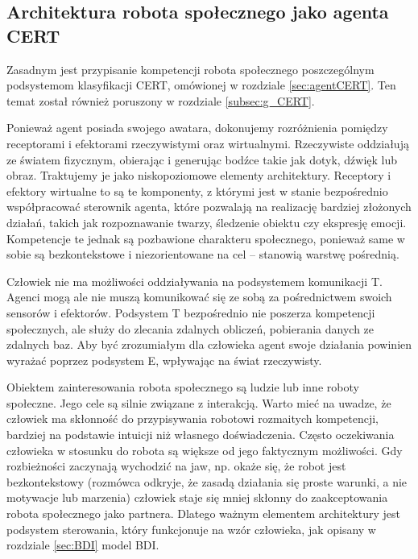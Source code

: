 \subsection{Architektura robota społecznego jako agenta CERT}
\label{subsec:CERT}

Zasadnym jest przypisanie kompetencji robota społecznego poszczególnym podsystemom klasyfikacji CERT, omówionej w rozdziale \ref{sec:agentCERT}. Ten temat został również poruszony w rozdziale \ref{subsec:g_CERT}.

Ponieważ agent posiada swojego awatara, dokonujemy rozróżnienia pomiędzy receptorami i efektorami rzeczywistymi oraz wirtualnymi. Rzeczywiste oddziałują ze światem fizycznym, obierając i generując bodźce takie jak dotyk, dźwięk lub obraz. Traktujemy je jako niskopoziomowe elementy architektury. Receptory i efektory wirtualne to są te komponenty, z którymi jest w stanie bezpośrednio współpracować sterownik agenta, które pozwalają na realizację bardziej złożonych działań, takich jak rozpoznawanie twarzy, śledzenie obiektu czy ekspresję emocji. Kompetencje te jednak są pozbawione charakteru społecznego, ponieważ same w sobie są bezkontekstowe i niezorientowane na cel – stanowią warstwę pośrednią.

Człowiek nie ma możliwości oddziaływania na podsystemem komunikacji T. Agenci mogą ale nie muszą komunikować się ze sobą za pośrednictwem swoich sensorów i efektorów. Podsystem T bezpośrednio nie poszerza kompetencji społecznych, ale służy do zlecania zdalnych obliczeń, pobierania danych ze zdalnych baz. Aby być zrozumiałym dla człowieka agent swoje działania powinien wyrażać poprzez podsystem E, wpływając na świat rzeczywisty. 

Obiektem zainteresowania robota społecznego są ludzie lub inne roboty społeczne. Jego cele są silnie związane z interakcją. Warto mieć na uwadze, że człowiek ma skłonność do przypisywania robotowi rozmaitych kompetencji, bardziej na podstawie intuicji niż własnego doświadczenia. Często oczekiwania człowieka w stosunku do robota są większe od jego faktycznym możliwości. Gdy rozbieżności zaczynają wychodzić na jaw, np. okaże się, że robot jest bezkontekstowy (rozmówca odkryje, że zasadą działania się proste warunki, a nie motywacje lub marzenia) %
człowiek staje się mniej skłonny do zaakceptowania robota społecznego jako partnera. Dlatego ważnym elementem architektury jest podsystem sterowania, który funkcjonuje na wzór człowieka, jak opisany w rozdziale \ref{sec:BDI} model BDI.

